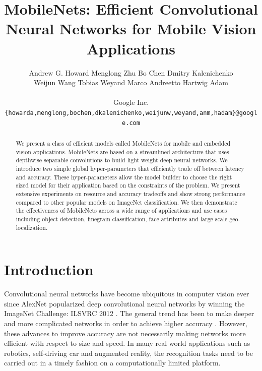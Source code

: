 \documentclass[10pt,twocolumn,letterpaper]{article}
\begin{document}
\title{MobileNets: Efficient Convolutional Neural Networks for Mobile Vision Applications}

\author{Andrew G. Howard
\qquad
Menglong Zhu
\qquad
Bo Chen
\qquad
Dmitry Kalenichenko\\
Weijun Wang
\qquad
Tobias Weyand
\qquad
Marco Andreetto
\qquad
Hartwig Adam\\
\vspace{0.2em}\\
Google Inc.\\
{\tt\small \{howarda,menglong,bochen,dkalenichenko,weijunw,weyand,anm,hadam\}@google.com}
}

\maketitle

\begin{abstract}
   We present a class of efficient models called MobileNets for mobile and embedded vision applications. MobileNets are based on a streamlined architecture that uses depthwise separable convolutions to build light weight deep neural networks. We introduce two simple global hyper-parameters that efficiently trade off between latency and accuracy. These hyper-parameters allow the model builder to choose the right sized model for their application based on the constraints of the problem. We present extensive experiments on resource and accuracy tradeoffs and show strong performance compared to other popular models on ImageNet classification. We then demonstrate the effectiveness of MobileNets across a wide range of applications and use cases including object detection, finegrain classification, face attributes and large scale geo-localization.
\end{abstract}

\section{Introduction}

Convolutional neural networks have become ubiquitous in computer vision ever since AlexNet \cite{krizhevsky2012imagenet} popularized deep convolutional neural networks by winning the ImageNet Challenge: ILSVRC 2012 \cite{russakovsky2015imagenet}. The general trend has been to make deeper and more complicated networks in order to achieve higher accuracy \cite{simonyan2014very,szegedy2015rethinking,szegedy2016inception,he2015deep}. However, these advances to improve accuracy are not necessarily making networks more efficient with respect to size and speed. In many real world applications such as robotics, self-driving car and augmented reality, the recognition tasks need to be carried out in a timely fashion on a computationally limited platform.
\end{document}
